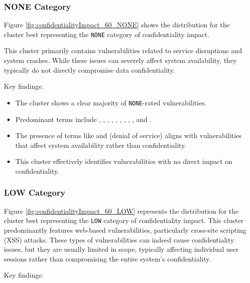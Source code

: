\documentclass[12pt]{article}
\begin{document}
\subsubsection*{NONE Category}

Figure \ref{fig:confidentialityImpact_60_NONE} shows the distribution for the cluster best
representing the \texttt{NONE} category of confidentiality impact.

This cluster primarily contains vulnerabilities related to service disruptions and system crashes.
While these issues can severely affect system availability, they typically do not directly
compromise data confidentiality.

Key findings:

\begin{itemize}

	\item The cluster shows a clear majority of \texttt{NONE}-rated vulnerabilities.

	\item Predominant terms include , , , ,
	      , , , , , and .

	\item The presence of terms like  and  (denial of service) aligns with
	      vulnerabilities that affect system availability rather than confidentiality.

	\item This cluster effectively identifies vulnerabilities with no direct impact on
	      confidentiality.

\end{itemize}

\subsubsection*{LOW Category}

Figure \ref{fig:confidentialityImpact_60_LOW} represents the distribution for the cluster best
representing the \texttt{LOW} category of confidentiality impact. This cluster predominantly
features web-based vulnerabilities, particularly cross-site scripting (XSS) attacks. These types of
vulnerabilities can indeed cause confidentiality issues, but they are usually limited in scope,
typically affecting individual user sessions rather than compromising the entire system's
confidentiality.

Key findings:
\end{document}
